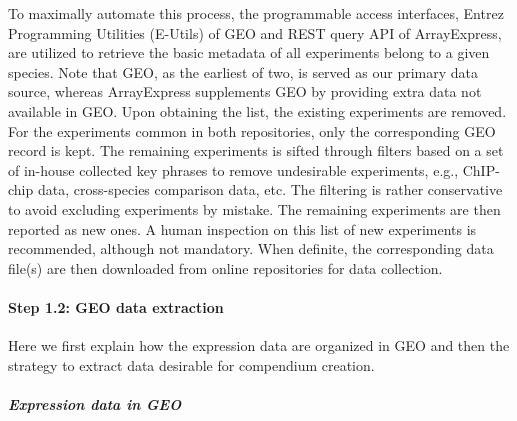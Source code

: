 To maximally automate this process, the programmable access interfaces,
Entrez Programming Utilities (E-Utils) of GEO and REST query API of
ArrayExpress, are utilized to retrieve the basic metadata of all
experiments belong to a given species.
%
Note that GEO, as the earliest of two, is served as our primary data source,
whereas ArrayExpress supplements GEO by providing extra data not available in
GEO.
%
Upon obtaining the list, the existing experiments are removed.  For the
experiments common in both repositories, only the corresponding GEO record
is kept.
%
The remaining experiments is sifted through filters based on a set of
in-house collected key phrases to remove undesirable experiments, e.g.,
ChIP-chip data, cross-species comparison data, etc.
%
The filtering is rather conservative to avoid excluding experiments by
mistake.
%
The remaining experiments are then reported as new ones.  A human inspection
on this list of new experiments is recommended, although not mandatory.
%
When definite, the corresponding data file(s) are then downloaded from online
repositories for data collection.









\paragraph{Step 1.2: GEO data extraction}
Here we first explain how the expression data are organized in GEO and then the
strategy to extract data desirable for compendium creation.


\subparagraph{Expression data in GEO}



